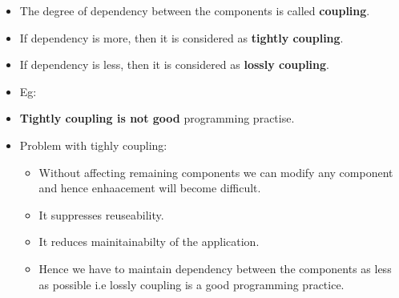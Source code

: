 \setlength{\columnsep}{3pt}
\begin{flushleft}
	
	\begin{itemize}
		\item The degree of dependency between the components is called \textbf{coupling}.
		\item If dependency is more, then it is considered as \textbf{tightly coupling}.
		\item If dependency is less, then it is considered as \textbf{lossly coupling}.
		\item Eg:
		\newpage
		\bigskip
		\bigskip
		\item \textbf{Tightly coupling is not good} programming practise.
		\item Problem with tighly coupling:
		\begin{itemize}
			\item Without affecting remaining components we can modify any component and hence enhaacement will become difficult.
			\item It suppresses reuseability. 
			\item It reduces mainitainabilty of the application.
			\item Hence we have to maintain dependency between the components as less as possible i.e lossly coupling is a good programming practice.
		\end{itemize}
		
	\end{itemize}	
	
\end{flushleft}
